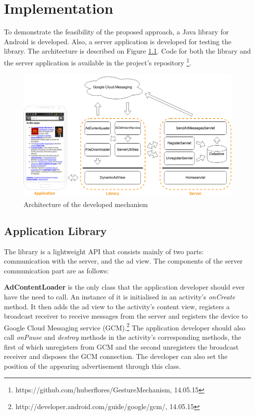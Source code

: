 \chapter{Implementation}

To demonstrate the feasibility of the proposed approach, a Java library for Android is developed. Also, a server application is developed for testing the library. The architecture is described on Figure \ref{fig:architecture}. Code for both the library and the server application is available in the project's repository \footnote[38]{https://github.com/huberflores/GestureMechanism, 14.05.15}.

\begin{figure}
\begin{center}
\includegraphics[scale=0.41]{Images/client-server.png}
\caption{Architecture of the developed mechanism}
\label{fig:architecture}
\end{center}
\end{figure}

\section{Application Library}

The library is a lightweight API that consists mainly of two parts: communication with the server,  and the ad view. The components of the server communication part are as follows:

\textbf{AdContentLoader} is the only class that the application developer should ever have the need to call. An instance of it is initialised in an activity's \textit{onCreate} method. It then adds the ad view to the activity's content view, registers a broadcast receiver to receive messages from the server and registers the device to Google Cloud Messaging service (GCM).\footnote[39]{http://developer.android.com/guide/google/gcm/, 14.05.15} The application developer should also call \textit{onPause} and \textit{destroy} methods in the activity's corresponding methods, the first of which unregisters from GCM and the second unregisters the broadcast receiver and disposes the GCM connection. The developer can also set the position of the appearing advertisement through this class.


